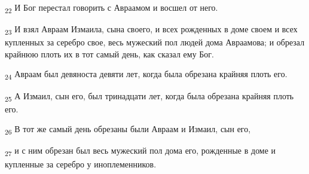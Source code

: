 \begin{tcolorbox}
\textsubscript{22} И Бог перестал говорить с Авраамом и восшел от него.
\end{tcolorbox}
\begin{tcolorbox}
\textsubscript{23} И взял Авраам Измаила, сына своего, и всех рожденных в доме своем и всех купленных за серебро свое, весь мужеский пол людей дома Авраамова; и обрезал крайнюю плоть их в тот самый день, как сказал ему Бог.
\end{tcolorbox}
\begin{tcolorbox}
\textsubscript{24} Авраам был девяноста девяти лет, когда была обрезана крайняя плоть его.
\end{tcolorbox}
\begin{tcolorbox}
\textsubscript{25} А Измаил, сын его, был тринадцати лет, когда была обрезана крайняя плоть его.
\end{tcolorbox}
\begin{tcolorbox}
\textsubscript{26} В тот же самый день обрезаны были Авраам и Измаил, сын его,
\end{tcolorbox}
\begin{tcolorbox}
\textsubscript{27} и с ним обрезан был весь мужеский пол дома его, рожденные в доме и купленные за серебро у иноплеменников.
\end{tcolorbox}
